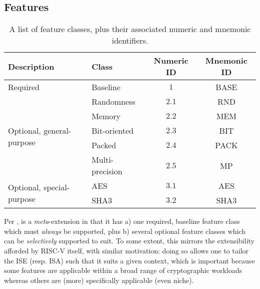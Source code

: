 
\subsection{Features}
\label{sec:bg:feature}

\begin{table}[t]
\begin{center}
\begin{tabular}{|l|l|cc|}
\hline
Description                                & Class           & Numeric ID & Mnemonic ID \\
\hline\hline
\multirow{1}{*}{Required                 } & Baseline        & $1$        & BASE        \\
\hline
\multirow{5}{*}{Optional, general-purpose} & Randomness      & $2.1$      & RND         \\
                                           & Memory          & $2.2$      & MEM         \\
                                           & Bit-oriented    & $2.3$      & BIT         \\
                                           & Packed          & $2.4$      & PACK        \\
                                           & Multi-precision & $2.5$      & MP          \\
\hline
\multirow{2}{*}{Optional, special-purpose} & AES             & $3.1$      & AES         \\
                                           & SHA3            & $3.2$      & SHA3        \\
\hline
\end{tabular}
\end{center}
\caption{A list of feature classes, plus their associated numeric and mnemonic identifiers.}
\label{tab:feature}
\end{table}

Per , \XCID is a {\em meta}-extension in that it has 
a) one     required, baseline feature class
   which must {\em always} be supported,
   plus
b) several optional           feature classes
   which can be {\em selectively} supported to suit.
To some extent, this mirrors the extensibility afforded by RISC-V itself, 
with similar motivation: doing so allows one to tailor the ISE (resp. ISA) 
such that it suits a given context, which is important because some features
are  applicable within a broad range of cryptographic workloads whereas
others are (more) specifically applicable (even niche).

